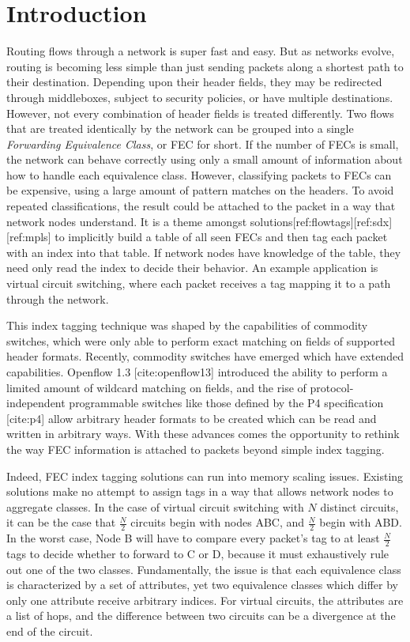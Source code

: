 \section{Introduction}


Routing flows through a network is super fast and easy. But as networks evolve, routing is becoming less simple than just sending packets along a shortest path to their destination. Depending upon their header fields, they may be redirected through middleboxes, subject to security policies, or have multiple destinations. However, not every combination of header fields is treated differently. Two flows that are treated identically by the network can be grouped into a single \textit{Forwarding Equivalence Class}, or FEC for short. If the number of FECs is small, the network can behave correctly using only a small amount of information about how to handle each equivalence class. However, classifying packets to FECs can be expensive, using a large amount of pattern matches on the headers. To avoid repeated classifications, the result could be attached to the packet in a way that network nodes understand. It is a theme amongst solutions[ref:flowtags][ref:sdx][ref:mpls] to implicitly build a table of all seen FECs and then tag each packet with an index into that table. If network nodes have knowledge of the table, they need only read the index to decide their behavior. An example application is virtual circuit switching, where each packet receives a tag mapping it to a path through the network. 

This index tagging technique was shaped by the capabilities of commodity switches, which were only able to perform exact matching on fields of supported header formats. Recently, commodity switches have emerged which have extended capabilities. Openflow 1.3 [cite:openflow13] introduced the ability to perform a limited amount of wildcard matching on fields, and the rise of protocol-independent programmable switches like those defined by the P4 specification [cite:p4] allow arbitrary header formats to be created which can be read and written in arbitrary ways. With these advances comes the opportunity to rethink the way FEC information is attached to packets beyond simple index tagging. 

Indeed, FEC index tagging solutions can run into memory scaling issues. 
Existing solutions make no attempt to assign tags in a way that allows network nodes to aggregate classes. In the case of virtual circuit switching with $N$ distinct circuits, it can be the case that $\frac{N}{2}$ circuits begin with nodes ABC, and $\frac{N}{2}$ begin with ABD. In the worst case, Node B will have to compare every packet's tag to at least $\frac{N}{2}$ tags to decide whether to forward to C or D, because it must exhaustively rule out one of the two classes. Fundamentally, the issue is that each equivalence class is characterized by a set of attributes, yet two equivalence classes which differ by only one attribute receive arbitrary indices. For virtual circuits, the attributes are a list of hops, and the difference between two circuits can be a divergence at the end of the circuit.



